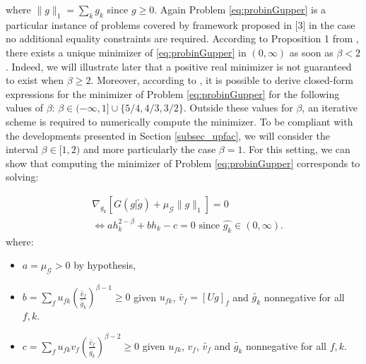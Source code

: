 \documentclass[a4paper, 11pt]{article}
\begin{document}
where $\|g\|_1=\sum_k g_k$ since $g \geq 0$. Again Problem \eqref{eq:probinGupper} is a particular instance of problems covered by framework proposed in [3] in the case no additional equality constraints are required. According to Proposition 1 from \cite{doi:10.1137/20M1377278}, there exists a unique minimizer of \eqref{eq:probinGupper} in $(0,\infty)$ as soon as $\beta < 2$. Indeed, we will illustrate later that a positive real minimizer is not guaranteed to exist when $\beta \geq 2$. Moreover, according to \cite{doi:10.1137/20M1377278}, it is possible to derive closed-form expressions for the minimizer of Problem \eqref{eq:probinGupper} for the following values of $\beta$: $\beta \in (-\infty,1] \cup \{5/4,4/3,3/2\}$. Outside these values for $\beta$, an iterative scheme is required to numerically compute the minimizer. To be compliant with the developments presented in Section \ref{subsec_upfac}, we will consider the interval $\beta \in [1,2)$ and more particularly the case $\beta=1$. For this setting, we can show that computing the minimizer of Problem \eqref{eq:probinGupper} corresponds to solving:

\begin{equation}\label{eq:polybetah}
    \begin{aligned}
       & \nabla_{g_k}\left[ G(g|\tilde{g}) + \mu_{\mathcal{G}} \|g\|_1 \right] = 0\\
        & \Leftrightarrow a h_k^{2-\beta} + b h_k - c  = 0 \text{ since } \hat{g_k} \in (0,\infty).
    \end{aligned}
\end{equation}
where:
\begin{itemize}
    \item $a=\mu_{\mathcal{G}} > 0 $ by hypothesis,
    \item $b=\sum_f u_{fk} \left( \frac{\tilde{v_{f}}}{\tilde{g_{k}}} \right)^{\beta-1} \geq 0$ given $u_{fk}$, $\tilde{v_{f}}=[Ug]_f$ and $\tilde{g_{k}}$ nonnegative for all $f,k$.
    \item $c=\sum_f u_{fk} v_f \left( \frac{\tilde{v_{f}}}{\tilde{g_{k}}} \right)^{\beta-2} \geq 0$ given $u_{fk}$, $v_{f}$, $\tilde{v_{f}}$ and $\tilde{g_{k}}$ nonnegative for all $f,k$.
\end{itemize}
\end{document}
